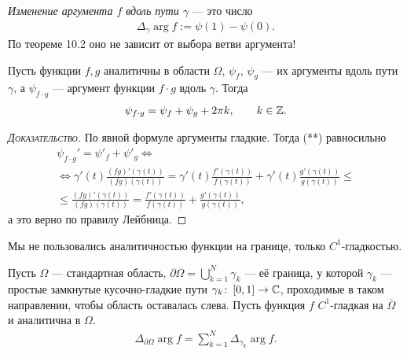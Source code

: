 \documentclass[../complex-analysis.tex]{subfiles}
\begin{document}
\begin{df}
 \textit{Изменение аргумента $ f $ вдоль пути $ \gamma $}  --- это число
 \begin{align*}
  \Delta_\gamma \arg f := \psi(1) - \psi(0).
 \end{align*} По теореме 10.2 оно не зависит от выбора ветви аргумента!
\end{df}
\begin{remrk}
 Пусть функции $ f,g $ аналитичны в области $ \Omega  $, $ \psi_f $, $ \psi_g $ --- их аргументы вдоль пути $ \gamma $, а $ \psi_{f\cdot g} $ --- аргумент функции $ f \cdot g $ вдоль $ \gamma $. Тогда
 \begin{align*}
  \psi_{f\cdot g} = \psi_f + \psi_g + 2\pi k, \qquad k \in \mathbb{Z}.
 \end{align*}
\end{remrk}
\begin{proof}[\normalfont\textsc{Доказательство}]
 По явной формуле аргументы гладкие. Тогда (**) равносильно
 \begin{align*}
  \psi_{f \cdot g}'  = \psi'_f + \psi'_g \iff \\
  \iff \gamma'(t) \frac{(fg)'(\gamma(t))}{(fg)(\gamma(t))} = \gamma'(t) \frac{f'(\gamma(t))}{f(\gamma(t))} +  \gamma'(t)\frac{g'(\gamma(t))}{g(\gamma(t))} \leqslant \\
  \leqslant \frac{(fg)'(\gamma(t))}{(fg)(\gamma(t))} = \frac{f'(\gamma(t))}{f(\gamma(t))} + \frac{g'(\gamma(t))}{g(\gamma(t))},
 \end{align*} а это верно по правилу Лейбница.
\end{proof}

\begin{remrk*}
 Мы не пользовались аналитичностью функции на границе, только $ C^{1} $-гладкостью.
\end{remrk*}

\begin{df}
 Пусть $ \Omega $ --- стандартная область, $ \partial \Omega  = \bigcup_{k=1}^{N} \gamma_k $  --- её граница, у которой $ \gamma_k $ --- простые замкнутые кусочно-гладкие пути  $ \gamma_k \colon\, [0,1] \to \mathbb{C} $, проходимые в таком направлении, чтобы область оставалась слева. Пусть функция $ f $ $ C^{1} $-гладкая на $ \overline \Omega $ и аналитична в $ \Omega $.
 \begin{align*}
  \Delta_{\partial \Omega} \arg f = \sum_{k=1}^{N}\Delta_{\gamma_k} \arg f.
 \end{align*}
\end{df}
\end{document}
